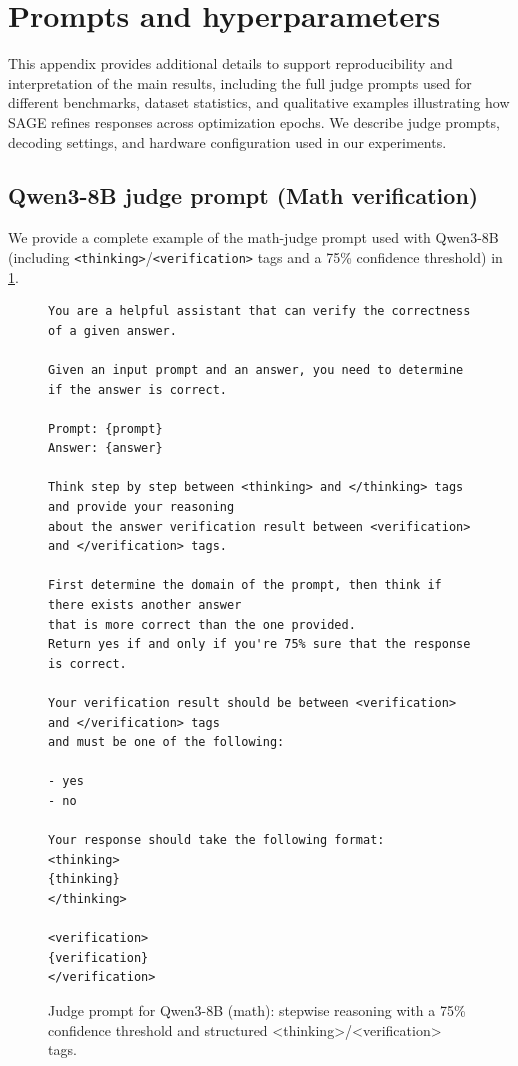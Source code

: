 \documentclass[11pt]{article}
\theoremstyle{plain}
\theoremstyle{definition}
\theoremstyle{remark}
\newcommand{\method}{SAGE}
\begin{document}



\appendix

\section{Prompts and hyperparameters}\label{sec:prompts-and-hyperparameters}
This appendix provides additional details to support reproducibility and interpretation of the main results, including the full judge prompts used for different benchmarks, dataset statistics, and qualitative examples illustrating how \method{} refines responses across optimization epochs. We describe judge prompts, decoding settings, and hardware configuration used in our experiments.

\subsection{Qwen3-8B judge prompt (Math verification)}
We provide a complete example of the math-judge prompt used with Qwen3-8B (including \texttt{<thinking>}/\texttt{<verification>} tags and a 75\% confidence threshold) in \cref{fig:appendix-qwen-math-judge}.


\begin{figure}[h]
\centering
\begin{minipage}{\linewidth}
\begin{small}
\begin{verbatim}
You are a helpful assistant that can verify the correctness of a given answer.

Given an input prompt and an answer, you need to determine if the answer is correct.

Prompt: {prompt}
Answer: {answer}

Think step by step between <thinking> and </thinking> tags and provide your reasoning
about the answer verification result between <verification> and </verification> tags.

First determine the domain of the prompt, then think if there exists another answer
that is more correct than the one provided.
Return yes if and only if you're 75% sure that the response is correct.

Your verification result should be between <verification> and </verification> tags
and must be one of the following:

- yes
- no

Your response should take the following format:
<thinking>
{thinking}
</thinking>

<verification>
{verification}
</verification>
\end{verbatim}
\end{small}
\end{minipage}
\caption{Judge prompt for Qwen3-8B (math): stepwise reasoning with a 75\% confidence threshold and structured <thinking>/<verification> tags.}
\label{fig:appendix-qwen-math-judge}
\end{figure}
\end{document}
